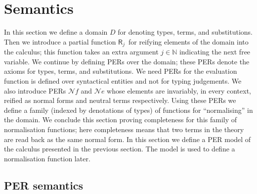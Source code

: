 \documentclass{LMCS}
\theoremstyle{plain}\newtheorem{satz}[thm]{Satz}
\newcommand{\NN}{\mathbb{N}}
\newcommand{\reify}[2]{\mathsf{R}_{#1}\,#2}
\newcommand{\perne}{\mathord{\mathcal{N}\!\mathit{e}}}
\newcommand{\pernf}{\mathord{\mathcal{N}\!\mathit{f}}}
\begin{document}
 \section{Semantics}
\label{sec:semantics}

\noindent In this section we define a domain $D$ for denoting types,
  terms, and substitutions. Then we introduce a partial function
  $\reify j {}$ for
  reifying elements of the domain into the calculus; this function
  takes an extra argument $j \in \NN$ indicating the next free variable.  We
  continue by defining PERs over the domain; these PERs denote the
  axioms for types, terms, and substitutions. We need PERs for the
  evaluation function is defined over syntactical entities and not for
  typing judgements. We also introduce PERs $\pernf$ and $\perne$ 
  whose elements are
  invariably, in every context, reified as normal forms and
  neutral terms respectively.  Using these PERs we define a family
  (indexed by denotations of types) of functions for ``normalising''
  in the domain. We conclude this section proving completeness for
  this family of normalisation functions; here completeness means that
  two terms in the theory are read back as the same normal form.
  In this section we define a PER model of the calculus presented in
  the previous section. The model is used to define a normalisation
  function later.

\subsection{PER semantics}
\label{sec:persem}
\end{document}
